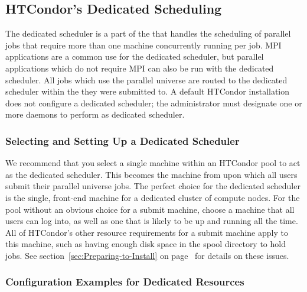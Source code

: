 \subsection{\label{sec:Config-Dedicated-Jobs}
HTCondor's Dedicated Scheduling} 

The dedicated scheduler is a part of the  that handles 
the scheduling of parallel jobs that require more than one machine
concurrently running per job.  
MPI applications are a common use for the dedicated scheduler, 
but parallel applications which do not require MPI can also be run 
with the dedicated scheduler.
All jobs which use the parallel universe are routed to the dedicated scheduler
within the  they were submitted to.  
A default HTCondor installation
does not configure a dedicated scheduler; 
the administrator must designate one or more  daemons
to perform as dedicated scheduler.

\subsubsection{\label{sec:Setup-Dedicated-Scheduler}
Selecting and Setting Up a Dedicated Scheduler}

We recommend that you select a single machine within an 
HTCondor pool to act as the dedicated scheduler.
This becomes the machine from upon which all users submit their 
parallel universe jobs.
The perfect choice for the dedicated scheduler 
is the single, front-end machine for
a dedicated cluster of compute nodes.
For the pool without an obvious choice for a submit machine,
choose a machine that all users can log into, as well as one
that is likely to be up and running all the time.
All of HTCondor's other resource requirements for a submit machine apply to
this machine, such as having enough disk space in the spool
directory to hold jobs. See section~\ref{sec:Preparing-to-Install} on
page~\pageref{sec:Preparing-to-Install} for details on these issues. 

\subsubsection{\label{sec:Configure-Dedicated-Resource}
Configuration Examples for Dedicated Resources} 

